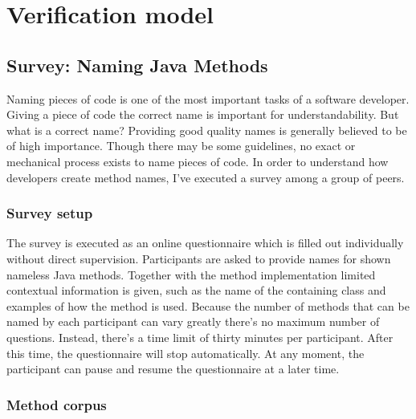 \section{Verification model}

\subsection{Survey: Naming Java Methods}

Naming pieces of code is one of the most important tasks of a software developer. Giving a piece of code the correct name is important for understandability. But what is a correct name? Providing good quality names is generally believed to be of high importance. Though there may be some guidelines, no exact or mechanical process exists to name pieces of code. In order to understand how developers create method names, I've executed a survey among a group of peers.

\subsubsection{Survey setup}

The survey is executed as an online questionnaire which is filled out individually without direct supervision.
Participants are asked to provide names for shown nameless Java methods. Together with the method implementation limited contextual information is given, such as the name of the containing class and examples of how the method is used.
Because the number of methods that can be named by each participant can vary greatly there's no maximum number of questions. Instead, there's a time limit of thirty minutes per participant. After this time, the questionnaire will stop automatically. At any moment, the participant can pause and resume the questionnaire at a later time. 


\subsubsection{Method corpus}





